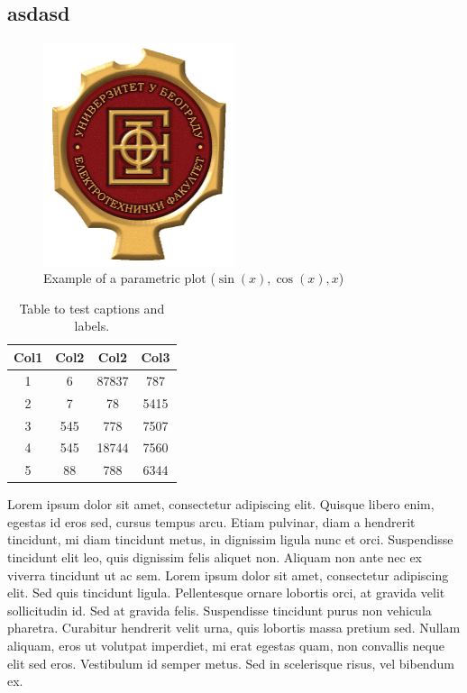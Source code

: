 \subsection{asdasd}
\begin{figure}[h]
	
	\centering
	\includegraphics[width=0.5\textwidth]{etf.png}
	\caption{Example of a parametric plot ($\sin (x), \cos(x), x$)}
\end{figure}
\begin{table}[h!]
	\centering
	\caption{Table to test captions and labels.}
	\begin{tabular}{||c c c c||} 
		\hline
		Col1 & Col2 & Col2 & Col3 \\ [0.5ex] 
		\hline\hline
		1 & 6 & 87837 & 787 \\ 
		2 & 7 & 78 & 5415 \\
		3 & 545 & 778 & 7507 \\
		4 & 545 & 18744 & 7560 \\
		5 & 88 & 788 & 6344 \\ [1ex] 
		\hline
	\end{tabular}
	
	\label{table:1}
\end{table}
Lorem ipsum dolor sit amet, consectetur adipiscing elit. Quisque libero enim, egestas id eros sed, cursus tempus arcu. Etiam pulvinar, diam a hendrerit tincidunt, mi diam tincidunt metus, in dignissim ligula nunc et orci. Suspendisse tincidunt elit leo, quis dignissim felis aliquet non. Aliquam non ante nec ex viverra tincidunt ut ac sem. Lorem ipsum dolor sit amet, consectetur adipiscing elit. Sed quis tincidunt ligula. Pellentesque ornare lobortis orci, at gravida velit sollicitudin id. Sed at gravida felis. Suspendisse tincidunt purus non vehicula pharetra. Curabitur hendrerit velit urna, quis lobortis massa pretium sed. Nullam aliquam, eros ut volutpat imperdiet, mi erat egestas quam, non convallis neque elit sed eros. Vestibulum id semper metus. Sed in scelerisque risus, vel bibendum ex.	
